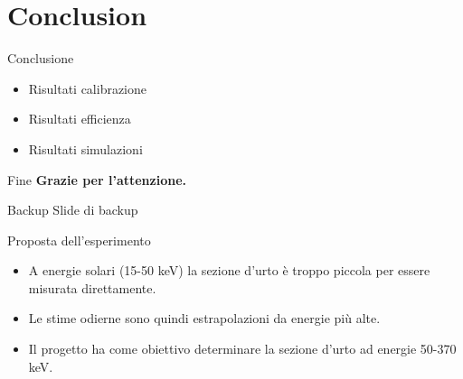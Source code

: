 \documentclass [xcolor=svgnames] {beamer}
\begin{document}
	\section{Conclusion}
	\begin{frame}{Conclusione}
		\begin{itemize}
			\item Risultati calibrazione
			\item Risultati efficienza
			\item Risultati simulazioni
		\end{itemize}
	\end{frame}
	
	\begin{frame}{Fine}
		\centering
		\textbf{Grazie per l'attenzione.}
	\end{frame}
	
\begin{frame}{Backup}
	\centering
	Slide di backup
\end{frame}

\begin{frame}{Proposta dell'esperimento}
	\begin{itemize}
		\item<1-> A energie solari (15-50 keV) la sezione d'urto è troppo piccola per essere misurata direttamente.
		\item<2-> Le stime odierne sono quindi estrapolazioni da energie più alte.
		\item<3-> Il progetto ha come obiettivo determinare la sezione d'urto ad energie 50-370 keV.
	\end{itemize}
\end{frame}
\end{document}
